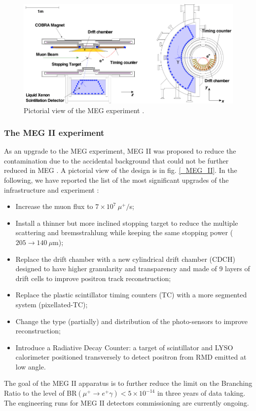 \documentclass[12pt,a4paper,openright, oneside, titlepage]{book} %
\begin{document}
\begin{figure}[h!]
\centering
\includegraphics[scale=1]{MEG}
\caption[MEG experiment]{Pictorial view of the MEG experiment \cite{Chiappini}\cite{MEG}.}
\label{_MEG}
\end{figure}

\subsubsection{The MEG II experiment} 
As an upgrade to the MEG experiment, MEG II was proposed to reduce the contamination due to the accidental background that could not be further reduced in MEG \cite{MEG_upgrade} \cite{MEG_II}.
A pictorial view of the design is in fig. \ref{_MEG_II}.
In the following, we have reported the list of the most significant upgrades of the infrastructure and experiment \cite{Chiappini}\cite{Papa}:

\begin{itemize}
\item Increase the muon flux to $7\times10^7\ \mu^+/$s;
\item Install a thinner but more inclined stopping target to reduce the multiple scattering and bremsstrahlung 
while keeping the same stopping power ($205 \rightarrow 140\ \mu$m);
\item Replace the drift chamber with a new cylindrical drift chamber (CDCH) designed  
to have higher granularity and transparency and made of 9 layers of drift cells to improve positron track reconstruction; 
\item Replace the plastic scintillator timing counters (TC) with a more segmented system (pixellated-TC);
\item Change the type (partially) and distribution of the photo-sensors to improve reconstruction;
\item Introduce a Radiative Decay Counter: a target of scintillator and LYSO calorimeter positioned transversely to detect positron from RMD emitted at low angle.
\end{itemize}
The goal of the MEG II apparatus is to further reduce the limit on the Branching Ratio to the level of BR$(\mu^+\rightarrow e^+\gamma)<5\times10^{-14}$ in three years of data taking. 
The engineering runs for MEG II detectors commissioning are currently ongoing.
\end{document}
